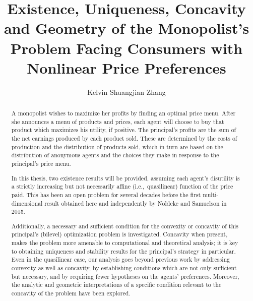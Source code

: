 \documentclass{ut-thesis}[10pt]
\author{Kelvin Shuangjian Zhang}
\title{Existence, Uniqueness, Concavity and Geometry of the Monopolist's Problem Facing Consumers with Nonlinear Price Preferences}
\theoremstyle{plain}
\theoremstyle{definition}
\theoremstyle{remark}
\numberwithin{equation}{section}
\begin{document}
\begin{preliminary}

\maketitle

\cleardoublepage

\begin{abstract}


	A monopolist wishes to maximize her profits by finding an optimal price menu. After she announces a menu of products and prices, each agent will choose to buy that product which maximizes his utility, if positive. 
	The principal's profits are the sum of the net earnings produced by each product sold.  
	These are determined by the costs of production and the distribution of products sold, which in turn are based on the distribution of anonymous agents and
	the choices they make in response to the principal's price menu. \medskip 
	
	In this thesis, two existence results will be provided, assuming each agent's disutility is a strictly increasing but not necessarily affine (i.e.,\ quasilinear) function of the price paid. This has been an open problem for several decades before the first multi-dimensional result obtained here and independently by N\"oldeke and Samuelson in 2015.\medskip
	

	Additionally, a necessary and sufficient condition for the convexity or concavity of this principal's (bilevel) optimization problem is investigated. 
	Concavity when present, makes the problem more amenable to 
	computational and theoretical analysis;  it is key to obtaining uniqueness and stability results for the principal's strategy in particular.  Even in the quasilinear case, our analysis goes beyond previous work by addressing convexity as well as concavity,  by establishing conditions which are not only sufficient but necessary,  and by requiring fewer hypotheses on the agents' preferences.	Moreover, the analytic and geometric interpretations of a specific condition relevant to the concavity of the problem have been explored.\medskip
	

\end{abstract}
\end{preliminary}
\end{document}
